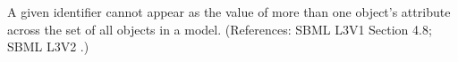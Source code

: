 A given identifier cannot appear as the value of more than one
\InitialAssignment{} object's  attribute across the set of
all \InitialAssignment{} objects in a model.  (References: SBML L3V1 Section 4.8; SBML L3V2
.)
